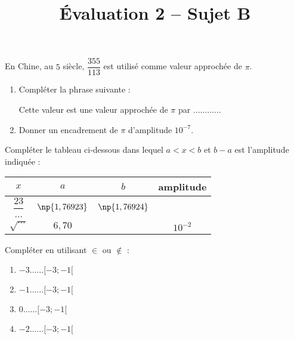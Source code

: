 \documentclass[a4paper,dvipsnames]{article}
\begin{document}
\title{Évaluation 2 -- Sujet B}

\date{}
\author{}
\maketitle{}

\pagestyle{empty}

\exo[2 points] En Chine, au $5$\ieme{} siècle, $\dfrac{355}{113}$ est utilisé comme valeur approchée de $\pi$.
\begin{enumerate}
  \item Compléter la phrase suivante :
    \begin{center}
      \og{}Cette valeur est une valeur approchée de $\pi$ par $\hdots\hdots\hdots\hdots$\fg{}
    \end{center}
  \item Donner un encadrement de $\pi$ d'amplitude $10^{-7}$.
\end{enumerate}

\bigskip

\exo[2 points] Compléter le tableau ci-dessous dans lequel $a<x<b$ et $b-a$ est l'amplitude indiquée :

\begin{center}
  \begin{tabular}{@{}cccc@{}}
    \toprule
    $x$ & $a$ & $b$ & amplitude\\
    \midrule
    \addlinespace[2mm]
    $\dfrac{23}{\hdots}$ & $\np{1,76923}$ & $\np{1,76924}$ &\\
    \addlinespace[2mm]
    $\sqrt{\hdots}$ & $6,70$ & & $10^{-2}$\\
  \end{tabular}
\end{center}

\bigskip

\exo[2 points] Compléter en utilisant $\in$ ou $\notin$ :
\begin{multicols}{4}
  \begin{enumerate}
    \item [] $-3\hdots\hdots[-3;-1[$\columnbreak
    \item [] $-1\hdots\hdots[-3;-1[$\columnbreak
    \item [] $0\hdots\hdots[-3;-1[$\columnbreak
    \item [] $-2\hdots\hdots[-3;-1[$
  \end{enumerate}
\end{multicols}
\end{document}
